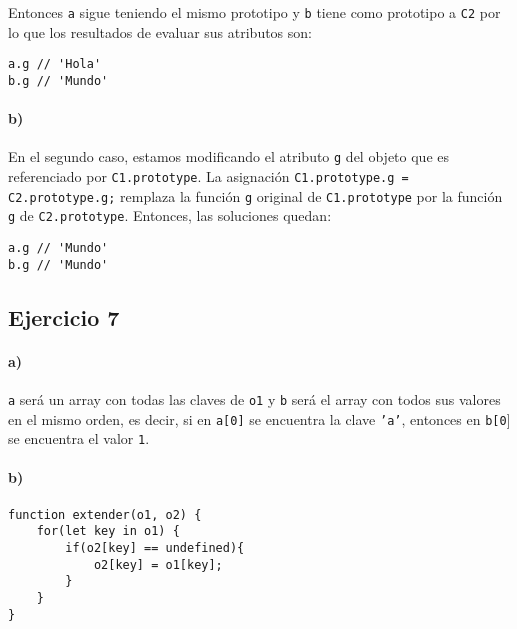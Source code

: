 \documentclass[10pt,a4paper]{article}
\begin{document}
Entonces \texttt{a} sigue teniendo el mismo prototipo y \texttt{b} tiene como prototipo a \texttt{C2} por lo que los resultados de evaluar sus atributos son:

\begin{centrado}
\begin{verbatim}
a.g // 'Hola'
b.g // 'Mundo'
\end{verbatim}
\end{centrado}

\paragraph{b)} En el segundo caso, estamos modificando el atributo \texttt{g} del objeto que es referenciado por \texttt{C1.prototype}. La asignación \texttt{C1.prototype.g = C2.prototype.g;} remplaza la función \texttt{g} original de \texttt{C1.prototype} por la función \texttt{g} de \texttt{C2.prototype}.
Entonces, las soluciones quedan:
\begin{centrado}
\begin{verbatim}
a.g // 'Mundo'
b.g // 'Mundo'
\end{verbatim}
\end{centrado}

\subsection{Ejercicio 7}
\paragraph{a)} \texttt{a} será un array con todas las claves de \texttt{o1} y \texttt{b} será el array con todos sus valores en el mismo orden, es decir, si en \texttt{a[0]} se encuentra la clave \texttt{'a'}, entonces en \texttt{b[0}] se encuentra el valor \texttt{1}.

\paragraph{b)}
\begin{centrado}
\begin{verbatim}
function extender(o1, o2) {
    for(let key in o1) {
        if(o2[key] == undefined){
            o2[key] = o1[key];
        }
    }
}
\end{verbatim}
\end{centrado}
\end{document}
